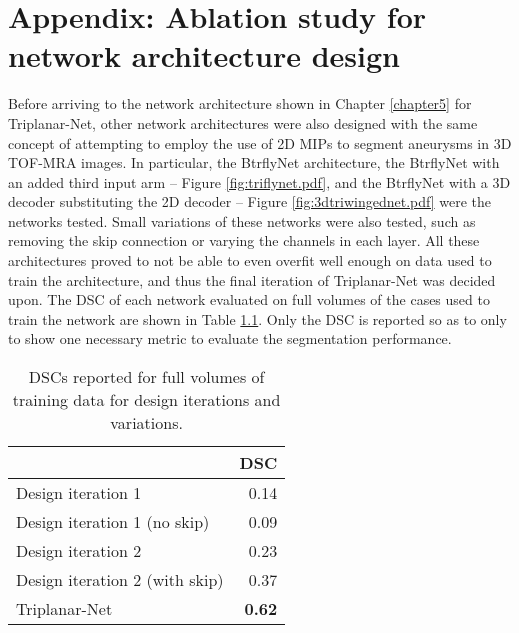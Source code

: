 \chapter{Appendix: Ablation study for network architecture design}
\label{appendix1}

Before arriving to the network architecture shown in Chapter \ref{chapter5} for Triplanar-Net, other network architectures were also designed with the same concept of attempting to employ the use of 2D MIPs to segment aneurysms in 3D TOF-MRA images. In particular, the BtrflyNet architecture, the BtrflyNet with an added third input arm -- Figure \ref{fig:triflynet.pdf}, and the BtrflyNet with a 3D decoder substituting the 2D decoder -- Figure \ref{fig:3dtriwingednet.pdf} were the networks tested. Small variations of these networks were also tested, such as removing the skip connection or varying the channels in each layer. All these architectures proved to not be able to even overfit well enough on data used to train the architecture, and thus the final iteration of Triplanar-Net was decided upon. The DSC of each network evaluated on full volumes of the cases used to train the network are shown in Table \ref{table:iterations}. Only the DSC is reported so as to only to show one necessary metric to evaluate the segmentation performance.



\begin{table}[htp]
	\centering
	
	\begin{tabular}{l | r}
		& DSC \\
		\hline
		Design iteration 1 & 0.14 \\
		Design iteration 1 (no skip) & 0.09 \\
		Design iteration 2 & 0.23 \\
		Design iteration 2 (with skip) & 0.37 \\
		Triplanar-Net & \textbf{0.62}
	\end{tabular}

	\caption[Evaluation on training data for architecture designs before Triplanar-Net.]{DSCs reported for full volumes of training data for design iterations and variations.}
	\label{table:iterations}
\end{table}

